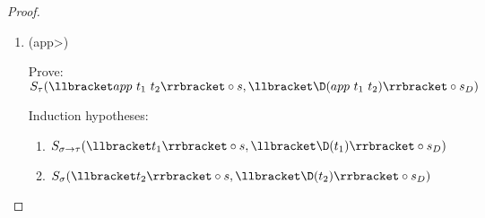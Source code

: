 \begin{proof}
\begin{enumerate}
\begin{itemize}
          \begin{align*}
            S&_\tau(\llbracket var\ (Pop\ v) \rrbracket \circ s, \llbracket \D(var\ (Pop\ v)) \rrbracket \circ s_D) \\
            &\Vdash \text{(Definition of $\D$)} \\
            & S_\tau(\llbracket var\ (Pop\ v) \rrbracket \circ s, \llbracket var\ (Pop\ v) \rrbracket \circ s_D) \\
            &\Vdash \text{(Definition of $\circ$)} \\
            & S_\tau(\lambda x. \llbracket var\ (Pop\ v) \rrbracket (s(x)), \lambda x. \llbracket var\ (Pop\ v) \rrbracket (s_D(x))) \\
            &\Vdash \text{(Definition of $\llbracket\rrbracket$)} \\
            & S_\tau(\lambda x. lookup\ \llbracket Pop\ v \rrbracket (s(x)), \lambda x. lookup\ \llbracket Pop\ v \rrbracket (s_D(x))) \\
            &\Vdash \text{(Rewrite using $s = \lambda x. hd(s(x))::tl(s(x))$)} \\
            & S_\tau(\lambda x. lookup\ \llbracket Pop\ v \rrbracket (hd(s(x))::tl(s(x))), \\
              & \;\;\; \lambda x. lookup\ \llbracket Pop\ v \rrbracket (hd(s_D(x))::tl(s_D(x)))) \\
            & \Vdash \text{(Simplify with lookup and $\llbracket Pop\ v \rrbracket$)} \\
            & S_\tau(\lambda x. lookup\ \llbracket v \rrbracket (tl(s(x))), \lambda x. lookup\ \llbracket v \rrbracket (tl(s_D(x)))) \\
            & \Vdash \text{(Use IH. \ref{eqn:subst_ih_var_Pop} with $f = tl(s(x))$ and $g = tl(s_D(x))$)}
          \end{align*} \qed
        \end{itemize}
      \item (\<app>)

        Prove: $S_\tau(\llbracket app\ t_1\ t_2 \rrbracket \circ s, \llbracket \D(app\ t_1\ t_2) \rrbracket \circ s_D)$

        Induction hypotheses:
        \begin{enumerate}
          \item \label{eqn:subst_ih_app1}$S_{\sigma\rightarrow\tau}(\llbracket t_1 \rrbracket \circ s, \llbracket \D(t_1) \rrbracket \circ s_D)$
          \item \label{eqn:subst_ih_app2}$S_{\sigma}(\llbracket t_2 \rrbracket \circ s, \llbracket \D(t_2) \rrbracket \circ s_D)$
        \end{enumerate}


\end{enumerate}
\end{proof}

